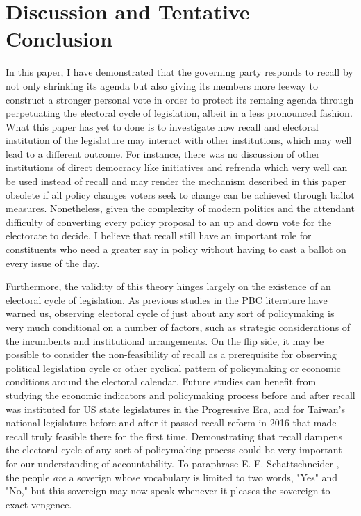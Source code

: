 \documentclass{article}
\begin{document}
	\section*{Discussion and Tentative Conclusion}
		In this paper, I have demonstrated that
		the governing party responds to recall by
		not only shrinking its agenda
		but also giving its members more leeway to construct a stronger personal vote
		in order to protect its remaing agenda
		through perpetuating
		the electoral cycle of legislation,
		albeit in a less pronounced fashion.
		What this paper has yet to done
		is to investigate how recall and electoral institution of the legislature
		may interact with other institutions,
		which may well lead to a different outcome.
		For instance,
		there was no discussion of other institutions of direct democracy
		like initiatives and refrenda
		which very well can be used instead of recall
		and may render the mechanism described in this paper obsolete
		if all policy changes voters seek to change can be achieved through ballot measures.
		Nonetheless,
		given the complexity of modern politics
		and the attendant difficulty of converting every policy proposal to
		an up and down vote for the electorate to decide,
		I believe that recall still have an important role for
		constituents who need a greater say in policy
		without having to cast a ballot on every issue of the day.
		
		Furthermore,
		the validity of this theory hinges largely on
		the existence of an electoral cycle of legislation.
		As previous studies in the PBC literature have warned us,
		observing electoral cycle of just about any sort of policymaking
		is very much conditional on a number of factors,
		such as strategic considerations of the incumbents
		and institutional arrangements.
		On the flip side,
		it may be possible to consider the non-feasibility of recall
		as a prerequisite for observing political legislation cycle
		or other cyclical pattern of policymaking or economic conditions
		around the electoral calendar.
		Future studies can benefit from studying
		the economic indicators and policymaking process
		before and after recall was instituted for US state legislatures
		in the Progressive Era,
		and for Taiwan's national legislature
		before and after it passed recall reform in 2016
		that made recall truly feasible there for the first time.
		Demonstrating that recall dampens the electoral cycle
		of any sort of policymaking process
		could be very important for our understanding of accountability.
		To paraphrase E. E. Schattschneider \autocite*[52]{schattschneiderPartyGovernmentAmerican2017},
		the people \textit{are} a soverign
		whose vocabulary is limited to two words, "Yes"
		and "No," but this sovereign may now speak
		whenever it pleases the sovereign to exact vengence.
		
		
		
		
		
	
	\newpage
	\printbibliography
			
\end{document}
